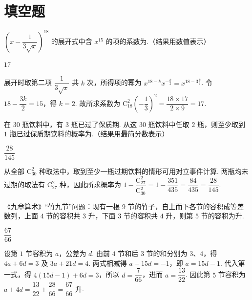 \section{填空题}

\begin{problem}
\(\left(x-\dfrac{1}{3\sqrt{x}}\right)^{18}\) 的展开式中含 \(x^{15}\) 的项的系数为\fillinblank{}.（结果用数值表示）
\end{problem}

\begin{answer}
\(17\)
\end{answer}

\begin{solution}
展开时取第二项 \(\dfrac{1}{3\sqrt{x}}\) 共 \(k\) 次，所得项的幂为 \(x^{18-k}x^{-\frac{k}{2}}=x^{18-3\frac{k}{2}}\). 令 \(18-\dfrac{3k}{2}=15\)，得 \(k=2\). 故所求系数为 \(\mathrm C_{18}^{2}\left(-\dfrac{1}{3}\right)^2=\dfrac{18\times17}{2\times9}=17\).
\end{solution}

\begin{problem}
在 \(30\) 瓶饮料中，有 \(3\) 瓶已过了保质期. 从这 \(30\) 瓶饮料中任取 \(2\) 瓶，则至少取到 \(1\) 瓶已过保质期饮料的概率为\fillinblank{}.（结果用最简分数表示）
\end{problem}

\begin{answer}
\(\dfrac{28}{145}\)
\end{answer}

\begin{solution}
从全部 \(\mathrm C_{30}^{2}\) 种取法中，取到至少一瓶过期饮料的情形可用对立事件计算. 两瓶均未过期的取法有 \(\mathrm C_{27}^{2}\) 种，因此所求概率为 \(1-\dfrac{\mathrm C_{27}^{2}}{\mathrm C_{30}^{2}}=1-\dfrac{351}{435}=\dfrac{84}{435}=\dfrac{28}{145}\).
\end{solution}

\begin{problem}
《九章算术》“竹九节”问题：现有一根 \(9\) 节的竹子，自上而下各节的容积成等差数列，上面 \(4\) 节的容积共 \(3\text{ 升}\)，下面 \(3\) 节的容积共 \(4\text{ 升}\)，则第 \(5\) 节的容积为\fillinblank{}\(\text{升}\).
\end{problem}

\begin{answer}
\(\dfrac{67}{66}\)
\end{answer}

\begin{solution}
设第 \(1\) 节容积为 \(a\)，公差为 \(d\). 由前 \(4\) 节和后 \(3\) 节的和分别为 \(3\)、\(4\)，得 \(4a+6d=3\) 及 \(3a+21d=4\). 两式相减得 \(a-15d=-1\)，即 \(a=15d-1\). 代入第一式，得 \(4(15d-1)+6d=3\)，所以 \(d=\dfrac{7}{66}\)，进而 \(a=\dfrac{13}{22}\). 因此第 \(5\) 节容积为 \(a+4d=\dfrac{13}{22}+\dfrac{28}{66}=\dfrac{67}{66}\text{ 升}\).
\end{solution}

